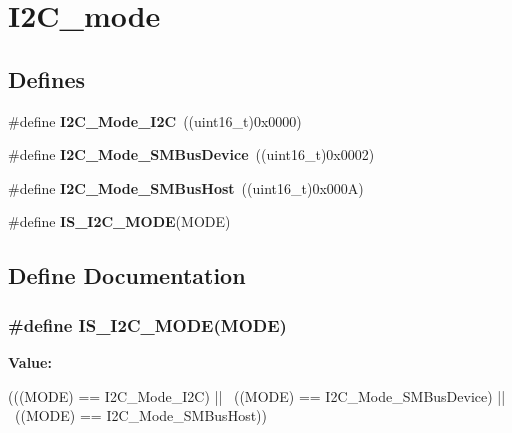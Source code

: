 \hypertarget{group__I2C__mode}{
\section{I2C\_\-mode}
\label{group__I2C__mode}
}
\subsection*{Defines}
\begin{DoxyCompactItemize}
\item 
\hypertarget{group__I2C__mode_ga8bc3b0555ca31b6f8423bc2ada45d1ac}{
\#define {\bfseries I2C\_\-Mode\_\-I2C}~((uint16\_\-t)0x0000)}
\label{group__I2C__mode_ga8bc3b0555ca31b6f8423bc2ada45d1ac}

\item 
\hypertarget{group__I2C__mode_gaf0cf66bc1f4986ba8a9925da924e06da}{
\#define {\bfseries I2C\_\-Mode\_\-SMBusDevice}~((uint16\_\-t)0x0002)}
\label{group__I2C__mode_gaf0cf66bc1f4986ba8a9925da924e06da}

\item 
\hypertarget{group__I2C__mode_gacfd37619c8d91dea5dec2921840acede}{
\#define {\bfseries I2C\_\-Mode\_\-SMBusHost}~((uint16\_\-t)0x000A)}
\label{group__I2C__mode_gacfd37619c8d91dea5dec2921840acede}

\item 
\#define {\bfseries IS\_\-I2C\_\-MODE}(MODE)
\end{DoxyCompactItemize}


\subsection{Define Documentation}
\hypertarget{group__I2C__mode_ga58464e1fe94a79bab721137a544baf79}{
\subsubsection[{IS\_\-I2C\_\-MODE}]{\setlength{\rightskip}{0pt plus 5cm}\#define IS\_\-I2C\_\-MODE(MODE)}}
\label{group__I2C__mode_ga58464e1fe94a79bab721137a544baf79}
{\bfseries Value:}
\begin{DoxyCode}
(((MODE) == I2C_Mode_I2C) || \
                           ((MODE) == I2C_Mode_SMBusDevice) || \
                           ((MODE) == I2C_Mode_SMBusHost))
\end{DoxyCode}
